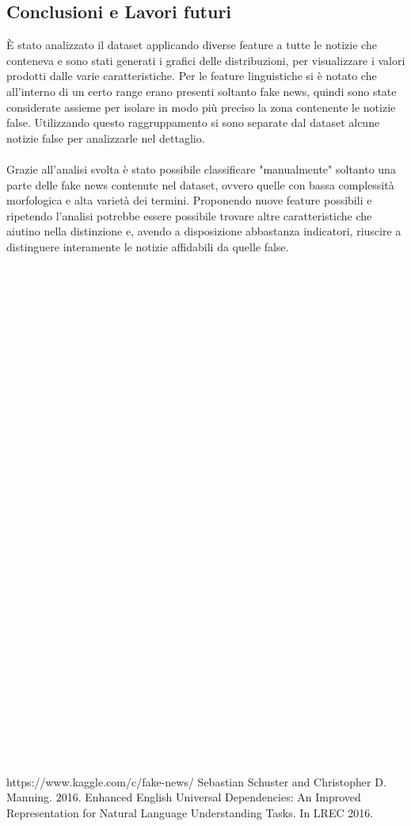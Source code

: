 \documentclass{article}
\begin{document}
\begin{multicols}{2}
		\section{Conclusioni e Lavori futuri}	
		È stato analizzato il dataset applicando diverse feature a tutte le notizie che conteneva e sono stati generati i grafici delle distribuzioni, per visualizzare i valori prodotti dalle varie caratteristiche. Per le feature linguistiche si è notato che all'interno di un certo range erano presenti soltanto fake news, quindi sono state considerate assieme per isolare in modo più preciso la zona contenente le notizie false. Utilizzando questo raggruppamento si sono separate dal dataset alcune notizie false per analizzarle nel dettaglio.
		\\~\\
		Grazie all'analisi svolta è stato possibile classificare "manualmente" soltanto una parte delle fake news contenute nel dataset, ovvero quelle con bassa complessità morfologica e alta varietà dei termini. Proponendo nuove feature possibili e ripetendo l'analisi potrebbe essere possibile trovare altre caratteristiche che aiutino nella distinzione e, avendo a disposizione abbastanza indicatori, riuscire a distinguere interamente le notizie affidabili da quelle false.
	   	\end{multicols}		       	

		\\~\\
		\\~\\
		\\~\\
		\\~\\
		\\~\\
		\\~\\
		\\~\\
		\\~\\
		\\~\\
		\\~\\
		\\~\\
		\\~\\
		\\~\\
		\\~\\
		\\~\\
		\\~\\
		\begin{thebibliography}{9}
				https://www.kaggle.com/c/fake-news/
				 Sebastian Schuster and Christopher D. Manning. 2016. Enhanced English Universal Dependencies: An Improved Representation for Natural Language Understanding Tasks. In LREC 2016. 
		\end{thebibliography}
\end{document}
